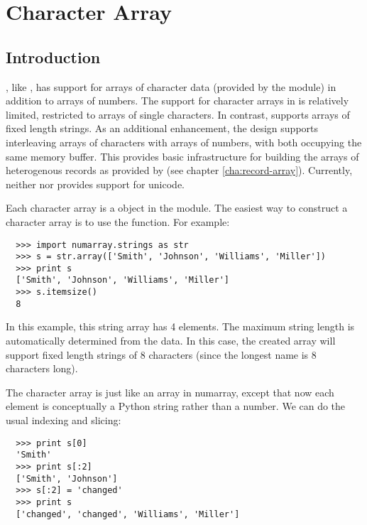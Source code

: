 \chapter{Character Array}
\label{cha:character-array}

\section{Introduction}
\label{sec:chararray-intro}

, like , has support for arrays of character data
(provided by the  module) in addition to arrays of
numbers.  The support for character arrays in  is relatively
limited, restricted to arrays of single characters.  In contrast,
 supports arrays of fixed length strings.  As an additional
enhancement, the  design supports interleaving arrays of
characters with arrays of numbers, with both occupying the same memory buffer.
This provides basic infrastructure for building the arrays of heterogenous
records as provided by  (see chapter
\ref{cha:record-array}).  Currently, neither  nor 
provides support for unicode.

Each character array is a   object in the
 module.  The easiest way to construct a character array
is to use the  function.  For example:

\begin{verbatim}
  >>> import numarray.strings as str
  >>> s = str.array(['Smith', 'Johnson', 'Williams', 'Miller'])
  >>> print s
  ['Smith', 'Johnson', 'Williams', 'Miller']
  >>> s.itemsize()
  8
\end{verbatim}
In this example, this string array has 4 elements.  The maximum string length
is automatically determined from the data.  In this case, the created array will
support fixed length strings of 8 characters (since the longest name is 8
characters long).

The character array is just like an array in numarray, except that now each
element is conceptually a Python string rather than a number.  We can do the
usual indexing and slicing:

\begin{verbatim}
  >>> print s[0]
  'Smith'
  >>> print s[:2]
  ['Smith', 'Johnson']
  >>> s[:2] = 'changed'
  >>> print s
  ['changed', 'changed', 'Williams', 'Miller']
\end{verbatim}

